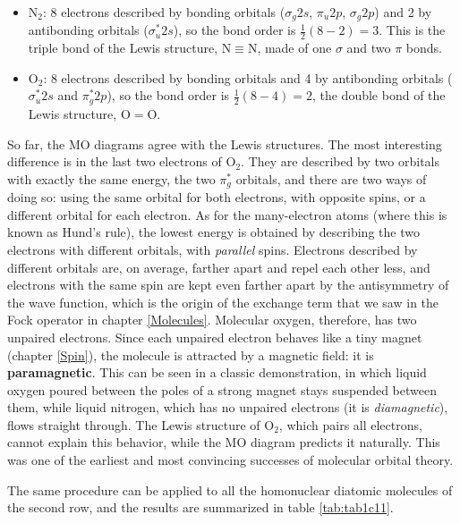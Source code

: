 \documentclass[
  english,
  9pt,
]{extbook}
\providecommand{\tightlist}{%
  \setlength{\itemsep}{0pt}\setlength{\parskip}{0pt}}
\theoremstyle{definition}
\theoremstyle{definition}
\theoremstyle{definition}
\theoremstyle{definition}
\theoremstyle{remark}
\begin{document}
\begin{itemize}
\tightlist
\item
  \(\mathrm{N}_2\): 8 electrons described by bonding orbitals (\(\sigma_g 2s\), \(\pi_u 2p\), \(\sigma_g 2p\)) and 2 by antibonding orbitals (\(\sigma_u^* 2s\)), so the bond order is \(\frac{1}{2}(8-2)=3\). This is the triple bond of the Lewis structure, \(\mathrm{N}\equiv\mathrm{N}\), made of one \(\sigma\) and two \(\pi\) bonds.
\item
  \(\mathrm{O}_2\): 8 electrons described by bonding orbitals and 4 by antibonding orbitals (\(\sigma_u^* 2s\) and \(\pi_g^* 2p\)), so the bond order is \(\frac{1}{2}(8-4)=2\), the double bond of the Lewis structure, \(\mathrm{O}=\mathrm{O}\).
\end{itemize}

So far, the MO diagrams agree with the Lewis structures. The most interesting difference is in the last two electrons of \(\mathrm{O}_2\). They are described by two orbitals with exactly the same energy, the two \(\pi_g^*\) orbitals, and there are two ways of doing so: using the same orbital for both electrons, with opposite spins, or a different orbital for each electron. As for the many-electron atoms (where this is known as Hund's rule), the lowest energy is obtained by describing the two electrons with different orbitals, with \emph{parallel} spins. Electrons described by different orbitals are, on average, farther apart and repel each other less, and electrons with the same spin are kept even farther apart by the antisymmetry of the wave function, which is the origin of the exchange term that we saw in the Fock operator in chapter \ref{Molecules}. Molecular oxygen, therefore, has two unpaired electrons. Since each unpaired electron behaves like a tiny magnet (chapter \ref{Spin}), the molecule is attracted by a magnetic field: it is \textbf{paramagnetic}. This can be seen in a classic demonstration, in which liquid oxygen poured between the poles of a strong magnet stays suspended between them, while liquid nitrogen, which has no unpaired electrons (it is \emph{diamagnetic}), flows straight through. The Lewis structure of \(\mathrm{O}_2\), which pairs all electrons, cannot explain this behavior, while the MO diagram predicts it naturally. This was one of the earliest and most convincing successes of molecular orbital theory.

The same procedure can be applied to all the homonuclear diatomic molecules of the second row, and the results are summarized in table \ref{tab:tab1c11}.
\end{document}
